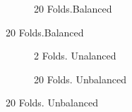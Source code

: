 \documentclass[12pt,a4paper]{article}
\begin{document}
\begin{figure}[h]
\begin{subfigure}{.5\textwidth}
	  \caption{20 Folds.Balanced} %
	\label{fig:n_folds_2}
	\end{subfigure}
\end{figure}



\begin{figure}[h]
\centering
\caption{\footnotesize [TODO].}	
\label{fig:n_folds_unbalanced}
	\begin{subfigure}{.5\textwidth}
	  \centering
	  \caption{2 Folds. Unalanced}  %
	\label{fig:n_folds_unbalanced_1}
	\end{subfigure}%
	\begin{subfigure}{.5\textwidth}
	  \centering
	  \caption{20 Folds. Unbalanced} %
	\label{fig:n_folds_unbalanced_2}
	\end{subfigure}
\end{figure}
\end{document}
